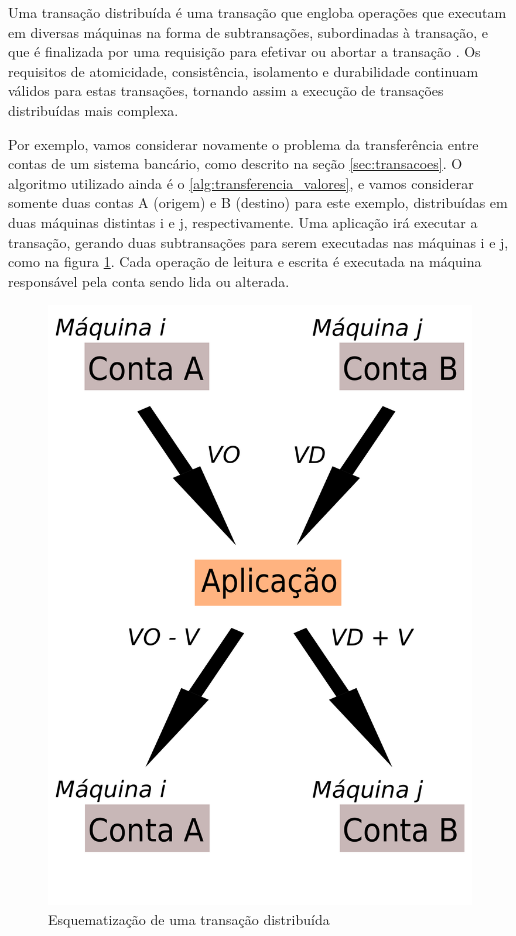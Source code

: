 \documentclass[11pt,twoside,a4paper]{book}
\begin{document}
Uma transação distribuída é uma transação que engloba operações que executam em diversas máquinas na forma de subtransações, subordinadas à transação, e que é finalizada por uma requisição para efetivar ou abortar a transação \cite{gray-lamport}. Os requisitos de atomicidade, consistência, isolamento e durabilidade continuam válidos para estas transações, tornando assim a execução de transações distribuídas mais complexa.

Por exemplo, vamos considerar novamente o problema da transferência entre contas de um sistema bancário, como descrito na seção \ref{sec:transacoes}. O algoritmo utilizado ainda é o \ref{alg:transferencia_valores}, e vamos considerar somente duas contas A (origem) e B (destino) para este exemplo, distribuídas em duas máquinas distintas i e j, respectivamente. Uma aplicação irá executar a transação, gerando duas subtransações para serem executadas nas máquinas i e j, como na figura \ref{fig:transacao_distribuida}. Cada operação de leitura e escrita é executada na máquina responsável pela conta sendo lida ou alterada. 


\begin{figure}
  \centering
  \includegraphics[width=.40\textwidth]{transacao_distribuida} 
  \caption{Esquematização de uma transação distribuída}
  \label{fig:transacao_distribuida} 
\end{figure}

\end{document}
